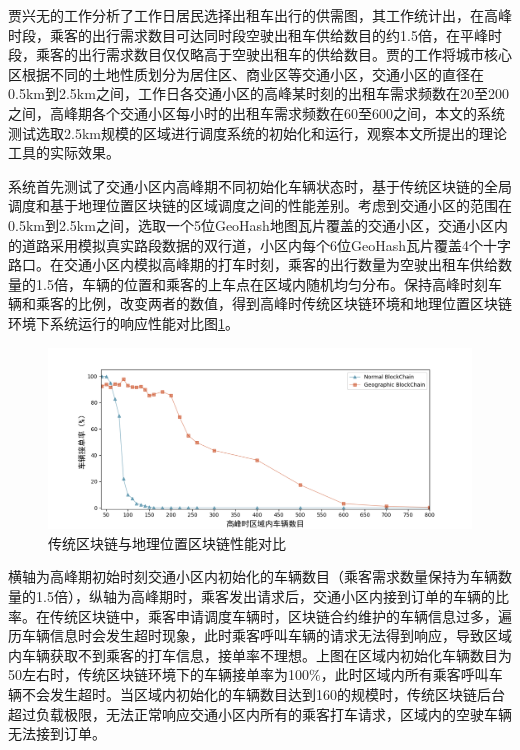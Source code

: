 贾兴无的工作分析了工作日居民选择出租车出行的供需图，其工作统计出，在高峰时段，乘客的出行需求数目可达同时段空驶出租车供给数目的约1.5倍，在平峰时段，乘客的出行需求数目仅仅略高于空驶出租车的供给数目。贾的工作将城市核心区根据不同的土地性质划分为居住区、商业区等交通小区，交通小区的直径在0.5km到2.5km之间，工作日各交通小区的高峰某时刻的出租车需求频数在20至200之间，高峰期各个交通小区每小时的出租车需求频数在60至600之间，本文的系统测试选取2.5km规模的区域进行调度系统的初始化和运行，观察本文所提出的理论工具的实际效果。

系统首先测试了交通小区内高峰期不同初始化车辆状态时，基于传统区块链的全局调度和基于地理位置区块链的区域调度之间的性能差别。考虑到交通小区的范围在0.5km到2.5km之间，选取一个5位GeoHash地图瓦片覆盖的交通小区，交通小区内的道路采用模拟真实路段数据的双行道，小区内每个6位GeoHash瓦片覆盖4个十字路口。在交通小区内模拟高峰期的打车时刻，乘客的出行数量为空驶出租车供给数量的1.5倍，车辆的位置和乘客的上车点在区域内随机均匀分布。保持高峰时刻车辆和乘客的比例，改变两者的数值，得到高峰时传统区块链环境和地理位置区块链环境下系统运行的响应性能对比图\ref{fig:compare}。

\begin{figure}[h]
  \centering
  \includegraphics[width=1.0\textwidth]{figures/性能对比}
  \caption{传统区块链与地理位置区块链性能对比}\label{fig:compare}
\end{figure}

横轴为高峰期初始时刻交通小区内初始化的车辆数目（乘客需求数量保持为车辆数量的1.5倍），纵轴为高峰期时，乘客发出请求后，交通小区内接到订单的车辆的比率。在传统区块链中，乘客申请调度车辆时，区块链合约维护的车辆信息过多，遍历车辆信息时会发生超时现象，此时乘客呼叫车辆的请求无法得到响应，导致区域内车辆获取不到乘客的打车信息，接单率不理想。上图在区域内初始化车辆数目为50左右时，传统区块链环境下的车辆接单率为100$\%$，此时区域内所有乘客呼叫车辆不会发生超时。当区域内初始化的车辆数目达到160的规模时，传统区块链后台超过负载极限，无法正常响应交通小区内所有的乘客打车请求，区域内的空驶车辆无法接到订单。

